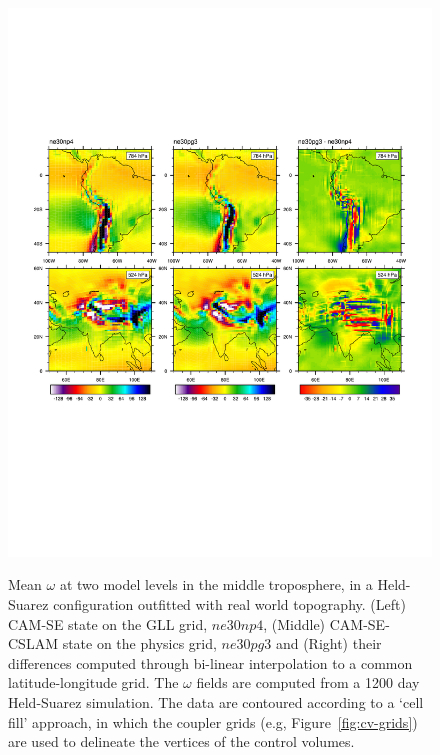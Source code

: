 \documentclass{ametsoc}
\begin{document}
{\begin{figure}[t]
\noindent\includegraphics[width=37pc,angle=0]{figs/FHS-contours-CROP.pdf}\\
\caption{Mean $\omega$ at two model levels in the middle troposphere, in a Held-Suarez configuration outfitted with real world topography. (Left) CAM-SE state on the GLL grid, $ne30np4$, (Middle) CAM-SE-CSLAM state on the physics grid, $ne30pg3$ and (Right) their differences computed through bi-linear interpolation to a common latitude-longitude grid. The $\omega$ fields are computed from a 1200 day Held-Suarez simulation. The data are contoured according to a `cell fill' approach, in which the coupler grids (e.g, Figure~\ref{fig:cv-grids}) are used to delineate the vertices of the control volumes.}
\label{fig:FHS-contours}
\end{figure}

}
\end{document}

